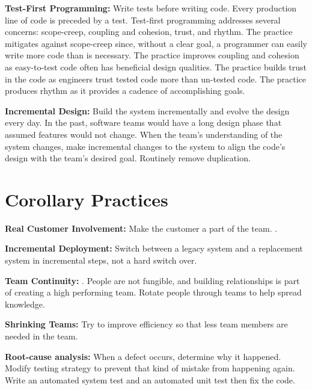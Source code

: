 \textbf{Test-First Programming:} Write tests before writing code. Every production line of code is preceded by a test.  Test-first programming addresses several concerns: scope-creep,  coupling and cohesion, trust, and rhythm. The practice mitigates against scope-creep since, without a clear goal, a programmer can easily write more code than is necessary. The practice improves coupling and cohesion as easy-to-test code often has beneficial design qualities. The practice builds trust in the code as engineers trust tested code more than un-tested code. The practice produces rhythm as it provides a cadence of accomplishing goals.


\textbf{Incremental Design:} Build the system incrementally and evolve the design every day. In the past, software teams would have a long design phase that assumed features would not change. When the team's understanding of the system changes, make incremental changes to the system to align the code's design with the team's desired goal. Routinely remove duplication.


\section{Corollary Practices}
\textbf{Real Customer Involvement:} Make the customer a part of the team.   \cite{BeckExtremeProgramming2004}.




\textbf{Incremental Deployment:} Switch between a legacy system and a replacement system in incremental steps, not a hard switch over.




\textbf{Team Continuity:}   \cite{BeckExtremeProgramming2004}. People are not fungible, and building relationships is part of creating a high performing team. Rotate people through teams to help spread knowledge.


\textbf{Shrinking Teams:} Try to improve efficiency so that less team members are needed in the team. 




\textbf{Root-cause analysis:} When a defect occurs, determine why it happened. Modify testing strategy to prevent that kind of mistake from happening again. Write an automated system test and an automated unit test then fix the code. 


